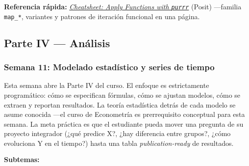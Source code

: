 \documentclass[11pt,letterpaper]{article}
\newcommand{\blue}[1]{{\color{cerulean}#1}}
\newcommand{\semana}[2]{%
  \subsubsection*{\color{main}Semana #1: #2}%
}
\newcommand{\cheatsheet}[2]{%
  \href{https://rstudio.github.io/cheatsheets/#1.pdf}{\textit{Cheatsheet: #2}}%
}
\begin{document}
\medskip
\noindent\textbf{Referencia rápida:} \cheatsheet{purrr}{Apply Functions with \texttt{purrr}} (Posit) ---familia \texttt{map\_*}, variantes y patrones de iteración funcional en una página.

\subsection*{\color{main}Parte IV --- Análisis}

\semana{11}{Modelado estadístico y series de tiempo}

Esta semana abre la Parte IV del curso. El enfoque es \blue{estrictamente programático}: cómo se especifican fórmulas, cómo se ajustan modelos, cómo se extraen y reportan resultados. La teoría estadística detrás de cada modelo se asume conocida ---el curso de Econometría es prerrequisito conceptual para esta semana. La meta práctica es que el estudiante pueda mover una pregunta de su proyecto integrador (¿qué predice X?, ¿hay diferencia entre grupos?, ¿cómo evoluciona Y en el tiempo?) hasta una tabla \textit{publication-ready} de resultados.

\textbf{Subtemas:}
\end{document}
